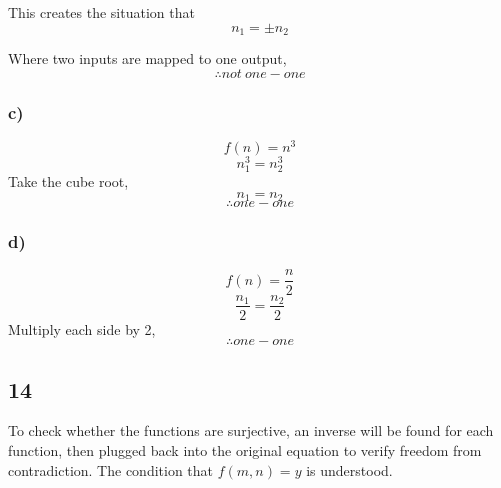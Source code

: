 \documentclass[journal]{IEEEtran}
\begin{document}
        This creates the situation that 
        \begin{equation}
            n_1 = \pm n_2
        \end{equation}

        Where two inputs are mapped to one output,
        \begin{equation}
            \boxed{\therefore not~one-one}
        \end{equation}

    \subsubsection*{c)}
        \begin{equation}
            f(n) = n^3
        \end{equation}
        \begin{equation}
            n_1^3 = n_2^3
        \end{equation}
        Take the cube root,
        \begin{equation}
            n_1 = n_2
        \end{equation}
        \begin{equation}
            \boxed{\therefore one-one}
        \end{equation}

    \subsubsection*{d)}
        \begin{equation}
            f(n) = \frac{n}{2}
        \end{equation}
        \begin{equation}
            \frac{n_1}{2} = \frac{n_2}{2}
        \end{equation}
        Multiply each side by 2,
        \begin{equation}
            \boxed{\therefore one-one}
        \end{equation}

\subsection*{14}
        To check whether the functions are surjective, an inverse will be found 
        for each function, then plugged back into the original equation to verify 
        freedom from contradiction. The condition that $f(m,n) = y$ is understood.
\end{document}

